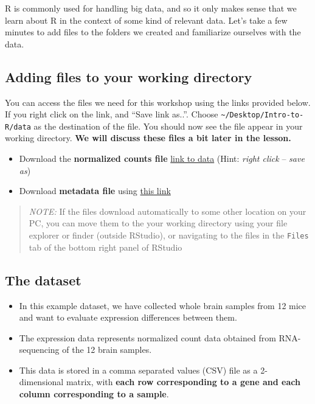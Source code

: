 \documentclass[
]{article}
\providecommand{\tightlist}{%
  \setlength{\itemsep}{0pt}\setlength{\parskip}{0pt}}
\begin{document}
R is commonly used for handling big data, and so it only makes sense
that we learn about R in the context of some kind of relevant data.
Let's take a few minutes to add files to the folders we created and
familiarize ourselves with the data.

\hypertarget{adding-files-to-your-working-directory}{%
\subsection{Adding files to your working
directory}\label{adding-files-to-your-working-directory}}

You can access the files we need for this workshop using the links
provided below. If you right click on the link, and ``Save link as..''.
Choose \texttt{\textasciitilde{}/Desktop/Intro-to-R/data} as the
destination of the file. You should now see the file appear in your
working directory. \textbf{We will discuss these files a bit later in
the lesson.}

\begin{itemize}
\tightlist
\item
  Download the \textbf{normalized counts file}
  \href{https://raw.githubusercontent.com/hbc/NGS_Data_Analysis_Course/master/sessionII/data/counts.rpkm.csv}{link
  to data} (Hint: \emph{right click} -- \emph{save as})
\item
  Download \textbf{metadata file} using
  \href{https://github.com/hbc/NGS_Data_Analysis_Course/raw/master/sessionII/data/mouse_exp_design.csv}{this
  link}
\end{itemize}

\begin{quote}
\emph{NOTE:} If the files download automatically to some other location
on your PC, you can move them to the your working directory using your
file explorer or finder (outside RStudio), or navigating to the files in
the \texttt{Files} tab of the bottom right panel of RStudio
\end{quote}

\hypertarget{the-dataset}{%
\subsection{The dataset}\label{the-dataset}}

\begin{itemize}
\tightlist
\item
  In this example dataset, we have collected whole brain samples from 12
  mice and want to evaluate expression differences between them.
\item
  The expression data represents normalized count data obtained from
  RNA-sequencing of the 12 brain samples.
\item
  This data is stored in a comma separated values (CSV) file as a
  2-dimensional matrix, with \textbf{each row corresponding to a gene
  and each column corresponding to a sample}.
\end{itemize}
\end{document}
